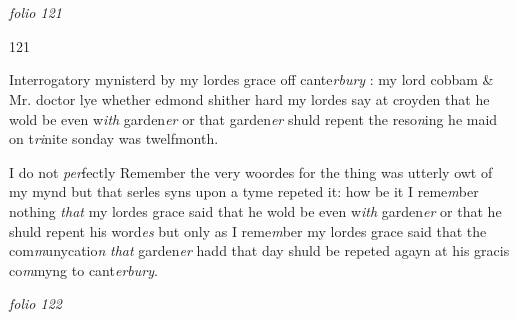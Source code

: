 \documentclass[12pt, a4paper]{book}
\begin{document}
\dotfill
						  \section*{}  \subsection*{}

\textit{folio 121}



\begin{flushright}{\color{Mahogany}121}\end{flushright}
            		
		\ifthenelse{\isodd{\thepage}}
		{\reversemarginpar}
		{\normalmarginpar}
		Interrogatory mynisterd by my lordes grace off
            			cante\textit{rbury} : my lord cobbam \& Mr. doctor lye whether
            			edmond shither hard my lordes say at croyden that
            			he wold be even w\textit{ith} garden\textit{er} or that garden\textit{er} shuld
 repent the reso\textit{n}ing he maid on t\textit{ri}nite sonday was
 twelfmonth.

		\ifthenelse{\isodd{\thepage}}
		{\reversemarginpar}
		{\normalmarginpar}
		I do not \textit{per}fectly Remember the very woordes for the thing was
 utterly owt of my mynd but that serles syns upon a tyme
	repeted it: how be it I reme\textit{m}ber nothing \textit{that} my lordes grace said
	that he wold be even w\textit{ith} garden\textit{er} or that he shuld repent his word\textit{es}
	but only as I reme\textit{m}ber my lordes grace said that the com\textit{m}unycatio\textit{n}
	\textit{that} garden\textit{er} hadd that day shuld be repeted agayn at his gracis
	co\textit{m}myng to cant\textit{erbury}.

\dotfill
						\newpage
{}

\textit{folio 122}


         \vspace*{4cm}
         
\dotfill
						  \section*{}  \subsection*{}
\end{document}
